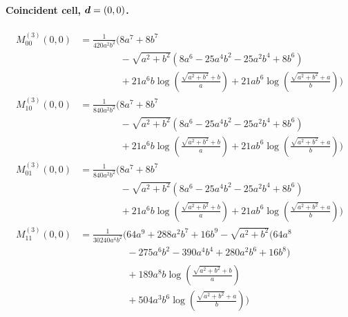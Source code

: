 \paragraph{Coincident cell, $\vb*{d}=(0,0)$.}
\begin{align*}
M^{(3)}_{00}(0,0) &= \frac{1}{420 a^{2} b^{2}}\Bigg(8 a^{7} + 8 b^{7}\\
&\phantom{{}=\frac{1}{420 a^{2} b^{2}}\Bigg(}- \sqrt{a^{2} + b^{2}}\left(8 a^{6} - 25 a^{4} b^{2} - 25 a^{2} b^{4} + 8 b^{6}\right)\\
&\phantom{{}=\frac{1}{420 a^{2} b^{2}}\Bigg(}+ 21 a^{6} b \log\left(\frac{\sqrt{a^{2} + b^{2}} + b}{a}\right) + 21 a b^{6} \log\left(\frac{\sqrt{a^{2} + b^{2}} + a}{b}\right)\Bigg)\\[1.2ex]
M^{(3)}_{10}(0,0) &= \frac{1}{840 a^{2} b^{2}}\Bigg(8 a^{7} + 8 b^{7}\\
&\phantom{{}=\frac{1}{840 a^{2} b^{2}}\Bigg(}- \sqrt{a^{2} + b^{2}}\left(8 a^{6} - 25 a^{4} b^{2} - 25 a^{2} b^{4} + 8 b^{6}\right)\\
&\phantom{{}=\frac{1}{840 a^{2} b^{2}}\Bigg(}+ 21 a^{6} b \log\left(\frac{\sqrt{a^{2} + b^{2}} + b}{a}\right) + 21 a b^{6} \log\left(\frac{\sqrt{a^{2} + b^{2}} + a}{b}\right)\Bigg)\\[1.2ex]
M^{(3)}_{01}(0,0) &= \frac{1}{840 a^{2} b^{2}}\Bigg(8 a^{7} + 8 b^{7}\\
&\phantom{{}=\frac{1}{840 a^{2} b^{2}}\Bigg(}- \sqrt{a^{2} + b^{2}}\left(8 a^{6} - 25 a^{4} b^{2} - 25 a^{2} b^{4} + 8 b^{6}\right)\\
&\phantom{{}=\frac{1}{840 a^{2} b^{2}}\Bigg(}+ 21 a^{6} b \log\left(\frac{\sqrt{a^{2} + b^{2}} + b}{a}\right) + 21 a b^{6} \log\left(\frac{\sqrt{a^{2} + b^{2}} + a}{b}\right)\Bigg)\\[1.2ex]
M^{(3)}_{11}(0,0) &= \frac{1}{30240 a^{4} b^{2}}\Bigg(64 a^{9} + 288 a^{2} b^{7} + 16 b^{9} - \sqrt{a^{2} + b^{2}}\bigl(64 a^{8}\\
&\phantom{{}=\frac{1}{30240 a^{4} b^{2}}\Bigg(}- 275 a^{6} b^{2} - 390 a^{4} b^{4} + 280 a^{2} b^{6} + 16 b^{8}\bigr)\\
&\phantom{{}=\frac{1}{30240 a^{4} b^{2}}\Bigg(}+ 189 a^{8} b \log\left(\frac{\sqrt{a^{2} + b^{2}} + b}{a}\right)\\
&\phantom{{}=\frac{1}{30240 a^{4} b^{2}}\Bigg(}+ 504 a^{3} b^{6} \log\left(\frac{\sqrt{a^{2} + b^{2}} + a}{b}\right)\Bigg)
\end{align*}
